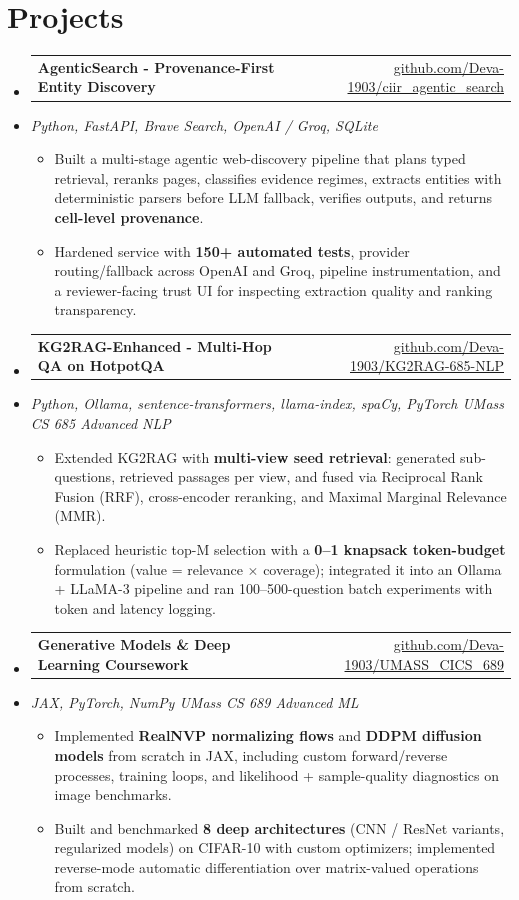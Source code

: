 \documentclass[letterpaper,10pt]{article}
\makeatletter
\newcommand{\resumeItem}[1]{
  \item\small{#1\vspace{-1pt}}
}
\newcommand{\resumeProjectHeading}[2]{
    \item
    \begin{tabular*}{0.985\textwidth}[t]{l@{\extracolsep{\fill}}r}
      \small\textbf{#1} & \small #2 \\
    \end{tabular*}\vspace{-5pt}
}
\newcommand{\resumeProjectSubheading}[1]{
  \vspace{-2pt}\item[] {\small\textcolor{ResumeSlate}{\emph{#1}}}\vspace{-3pt}
}
\newcommand{\resumeSubHeadingListStart}{\begin{itemize}[leftmargin=0.0in, label={}, itemsep=2pt, topsep=2pt]}
\newcommand{\resumeSubHeadingListEnd}{\end{itemize}}
\newcommand{\resumeItemListStart}{\begin{itemize}[leftmargin=0.18in, itemsep=2pt, topsep=1pt]}
\newcommand{\resumeItemListEnd}{\end{itemize}\vspace{-4pt}}
\makeatother
\begin{document}
\section{Projects}
\resumeSubHeadingListStart
  \resumeProjectHeading
    {AgenticSearch - Provenance-First Entity Discovery}
    {\href{https://github.com/Deva-1903/ciir_agentic_search}{github.com/Deva-1903/ciir\_agentic\_search}}
  \resumeProjectSubheading{Python, FastAPI, Brave Search, OpenAI / Groq, SQLite}
    \resumeItemListStart
      \resumeItem{Built a multi-stage agentic web-discovery pipeline that plans typed retrieval, reranks pages, classifies evidence regimes, extracts entities with deterministic parsers before LLM fallback, verifies outputs, and returns \textbf{cell-level provenance}.}
      \resumeItem{Hardened service with \textbf{150+ automated tests}, provider routing/fallback across OpenAI and Groq, pipeline instrumentation, and a reviewer-facing trust UI for inspecting extraction quality and ranking transparency.}
    \resumeItemListEnd
  \resumeProjectHeading
    {KG2RAG-Enhanced - Multi-Hop QA on HotpotQA}
    {\href{https://github.com/Deva-1903/KG2RAG-685-NLP}{github.com/Deva-1903/KG2RAG-685-NLP}}
  \resumeProjectSubheading{Python, Ollama, sentence-transformers, llama-index, spaCy, PyTorch \enspace\textbar\enspace UMass CS 685 Advanced NLP}
    \resumeItemListStart
      \resumeItem{Extended KG2RAG with \textbf{multi-view seed retrieval}: generated sub-questions, retrieved passages per view, and fused via Reciprocal Rank Fusion (RRF), cross-encoder reranking, and Maximal Marginal Relevance (MMR).}
      \resumeItem{Replaced heuristic top-M selection with a \textbf{0--1 knapsack token-budget} formulation (value = relevance \(\times\) coverage); integrated it into an Ollama + LLaMA-3 pipeline and ran 100--500-question batch experiments with token and latency logging.}
    \resumeItemListEnd
  \resumeProjectHeading
    {Generative Models \& Deep Learning Coursework}
    {\href{https://github.com/Deva-1903/UMASS_CICS_689}{github.com/Deva-1903/UMASS\_CICS\_689}}
  \resumeProjectSubheading{JAX, PyTorch, NumPy \enspace\textbar\enspace UMass CS 689 Advanced ML}
    \resumeItemListStart
      \resumeItem{Implemented \textbf{RealNVP normalizing flows} and \textbf{DDPM diffusion models} from scratch in JAX, including custom forward/reverse processes, training loops, and likelihood + sample-quality diagnostics on image benchmarks.}
      \resumeItem{Built and benchmarked \textbf{8 deep architectures} (CNN / ResNet variants, regularized models) on CIFAR-10 with custom optimizers; implemented reverse-mode automatic differentiation over matrix-valued operations from scratch.}
    \resumeItemListEnd
\resumeSubHeadingListEnd
\vspace{-4pt}
\end{document}
